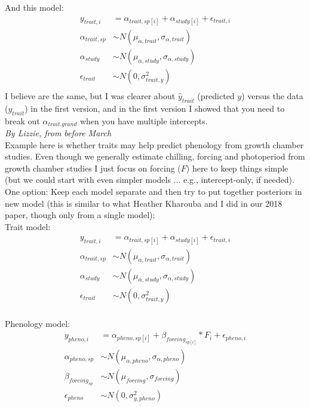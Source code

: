 \documentclass[11pt,letter]{article}
\begin{document}
And this model:
\begin{align*}
y_{trait, i} &= \alpha_{trait, sp[i]} + \alpha_{study[i]} + \epsilon_{trait, i}\\
\alpha_{trait, sp} & \sim N(\mu_{\alpha, trait}, \sigma_{\alpha, trait}) \\
\alpha_{study}  & \sim N(\mu_{\alpha, study}, \sigma_{\alpha, study})\\
\epsilon_{trait} & \sim N(0,\sigma^2_{trait, y}) \\
\end{align*}
I believe are the same, but I was clearer about $\hat{y}_{trait}$ (predicted $y$) versus the data ($y_{trait}$) in the first version, and in the first version I showed that you need to break out $\alpha_{trait.grand}$ when you have multiple intercepts.\\

\newpage
\emph{By Lizzie, from before March}\\

Example here is whether traits may help predict phenology from growth chamber studies. Even though we generally estimate chilling, forcing and photoperiod from growth chamber studies I just focus on forcing ($F$) here to keep things simple (but we could start with even simpler models ... e.g., intercept-only, if needed).\\

One option: Keep each model separate and then try to put together posteriors in new model (this is similar to what Heather Kharouba and I did in our 2018 paper, though only from a single model):\\

Trait model:
\begin{align*}
y_{trait, i} &= \alpha_{trait, sp[i]} + \alpha_{study[i]} + \epsilon_{trait, i}\\
\alpha_{trait, sp} & \sim N(\mu_{\alpha, trait}, \sigma_{\alpha, trait}) \\
\alpha_{study}  & \sim N(\mu_{\alpha, study}, \sigma_{\alpha, study})\\
\epsilon_{trait} & \sim N(0,\sigma^2_{trait, y}) \\
\end{align*}

Phenology model:
\begin{align*}
y_{pheno, i} &= \alpha_{pheno, sp[i]} + \beta_{forcing_{sp[i]}}*F_i+ \epsilon_{pheno, i}\\
\alpha_{pheno, sp} & \sim N(\mu_{\alpha, pheno}, \sigma_{\alpha, pheno}) \\
\beta_{forcing_{sp}} & \sim N(\mu_{forcing}, \sigma_{forcing})\\
\epsilon_{pheno} & \sim N(0,\sigma^2_{y, pheno}) 
\end{align*}
\end{document}
